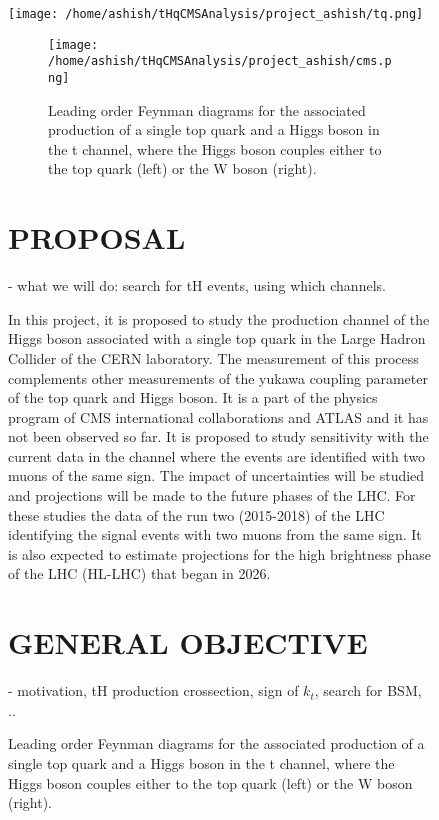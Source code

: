 \documentclass[final,3p]{CSP}
\begin{document}
\begin{figure}
  \centering
   \texttt{[image: /home/ashish/tHqCMSAnalysis/project\_ashish/tq.png]}
  \caption{Higgs production using the top quark (left) and W boson (right).}
  \label{figure 8}

  \begin{figure}
  \centering
  \texttt{[image: /home/ashish/tHqCMSAnalysis/project\_ashish/cms.png]}
  \caption{Leading order Feynman diagrams for the associated production of a single top quark and a Higgs boson in the t channel, where the Higgs boson couples either to the top quark (left) or the W boson (right).}
   \label{figure 9}
\end{figure}

\section{PROPOSAL}

- what we will do:  search for tH events, using which channels.

In this project, it is proposed to study the production channel of the Higgs boson associated 
with a single top quark in the Large Hadron Collider of the CERN laboratory. The measurement 
of this process complements other measurements of the yukawa coupling parameter of the top 
quark and Higgs boson. It is a part of the physics program of CMS international 
collaborations and ATLAS and it has not been observed so far. It is proposed to study 
sensitivity with the current data in the channel where the events are identified with two 
muons of the same sign. The impact of uncertainties will be studied and projections will be 
made to the future phases of the LHC. For these studies the data of the run two (2015-2018) 
of the LHC identifying the signal events with two muons from the same sign. It is also 
expected to estimate projections for the high brightness phase of the LHC (HL-LHC) that began 
in 2026. 

\section{GENERAL OBJECTIVE}

- motivation, tH production crossection, sign of $k_t$, search for BSM, ..


\end{figure}
\end{document}
